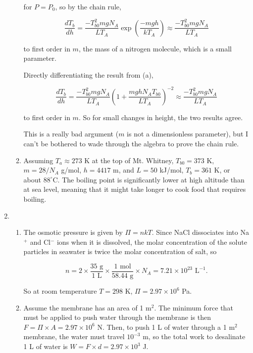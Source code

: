 \documentclass{article}
\begin{document}
\begin{enumerate}
\begin{enumerate}
		for $P = P_0$, so by the chain rule,
		 
		$$\frac{dT_b}{dh} =  \frac{-T_{b0}^2mgN_A}{LT_A} \exp \left( \frac{-mgh}{kT_A} \right) \approx \frac{-T_{b0}^2mgN_A}{LT_A}$$

		to first order in $m$, the mass of a nitrogen molecule, which is a small parameter.

		Directly differentiating the result from (a),

		$$\frac{dT_b}{dh} = \frac{-T_{b0}^2 mg N_A}{LT_A} \left(1 + \frac{mghN_A T_{b0}}{L T_A} \right)^{-2} \approx \frac{-T_{b0}^2mgN_A}{LT_A}$$

		to first order in $m$. So for small changes in height, the two results agree.

		This is a really bad argument ($m$ is not a dimensionless parameter), but I can't be bothered to wade through the algebra to prove the chain rule.

		\item 

		Assuming $T_a \approx 273$ K at the top of Mt. Whitney, $T_{b0} = 373$ K, $m=28 / N_A$ g/mol, $h = 4417$ m, and $L = 50$ kJ/mol, $T_b = 361$ K, or about $88^\circ$C. The boiling point is significantly lower at high altitude than at sea level, meaning that it might take longer to cook food that requires boiling.
	\end{enumerate}

	\item

	\begin{enumerate}

		\item

		The osmotic pressure is given by $\Pi = n k T$. Since NaCl dissociates into Na$^+$ and Cl$^-$ ions when it is dissolved, the molar concentration of the solute particles in seawater is twice the molar concentration of salt, so

		$$n = 2 \times \frac{35 \text{ g}}{1 \text{ L}} \times \frac{1 \text{ mol}}{58.44 \text{ g}} \times N_A = 7.21 \times 10^{23} \text{ L}^{-1}.$$

		So at room temperature $T = 298$ K, $\Pi = 2.97 \times 10^6$ Pa.

		\item

		Assume the membrane has an area of 1 m$^2$. The minimum force that must be applied to push water through the membrane is then $F = \Pi \times A = 2.97 \times 10^6$ N. Then, to push 1 L of water through a 1 m$^2$ membrane, the water must travel $10^{-3}$ m, so the total work to desalinate 1 L of water is $W = F \times d = 2.97 \times 10^3$ J.


\end{enumerate}
\end{enumerate}
\end{document}
